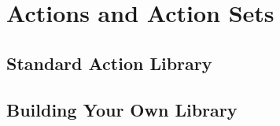 \chapter{Actions and Action Sets}
\minitoc


\section{Standard Action Library}




\section{Building Your Own Library}

